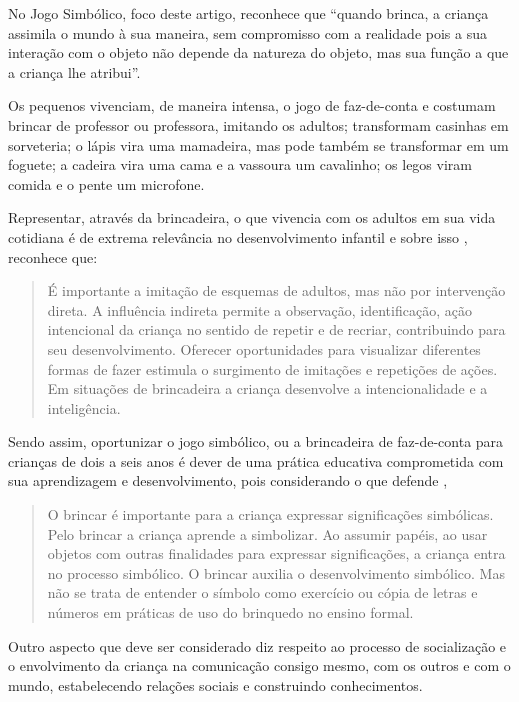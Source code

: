 \begin{refsection}
    No Jogo Simbólico, foco deste artigo, \textcite[p.~36]{KISHIMOTO1999Jogo} reconhece que “quando brinca, a criança assimila o mundo à sua maneira, sem compromisso com a realidade pois a sua interação com o objeto não depende da natureza do objeto, mas sua função a que a criança lhe atribui”. 

    Os pequenos vivenciam, de maneira intensa, o jogo de faz-de-conta e costumam brincar de professor ou professora, imitando os adultos; transformam casinhas em sorveteria; o lápis vira uma mamadeira, mas pode também se transformar em um foguete; a cadeira vira uma cama e a vassoura um cavalinho; os legos viram comida e o pente um microfone. 

    Representar, através da brincadeira, o que vivencia com os adultos em sua vida cotidiana é de extrema relevância no desenvolvimento infantil e sobre isso \textcite[p.~146]{KISHIMOTO2002Brincar}, reconhece que: 

    \begin{quotation}
        É importante a imitação de esquemas de adultos, mas não por intervenção direta. A influência indireta permite a observação, identificação, ação intencional da criança no sentido de repetir e de recriar, contribuindo para seu desenvolvimento. Oferecer oportunidades para visualizar diferentes formas de fazer estimula o surgimento de imitações e repetições de ações. Em situações de brincadeira a criança desenvolve a intencionalidade e a inteligência. 
    \end{quotation}

    Sendo assim, oportunizar o jogo simbólico, ou a brincadeira de faz-de-conta para crianças de dois a seis anos é dever de uma prática educativa comprometida com sua aprendizagem e desenvolvimento, pois considerando o que defende \textcite[p.~87]{KISHIMOTO2009BrincarÉDiferente}, 

    \begin{quotation}
        O brincar é importante para a criança expressar significações simbólicas. Pelo brincar a criança aprende a simbolizar. Ao assumir papéis, ao usar objetos com outras finalidades para expressar significações, a criança entra no processo simbólico. O brincar auxilia o desenvolvimento simbólico. Mas não se trata de entender o símbolo como exercício ou cópia de letras e números em práticas de uso do brinquedo no ensino formal. 
    \end{quotation}

    Outro aspecto que deve ser considerado diz respeito ao processo de socialização e o envolvimento da criança na comunicação consigo mesmo, com os outros e com o mundo, estabelecendo relações sociais e construindo conhecimentos. 


\end{refsection}
